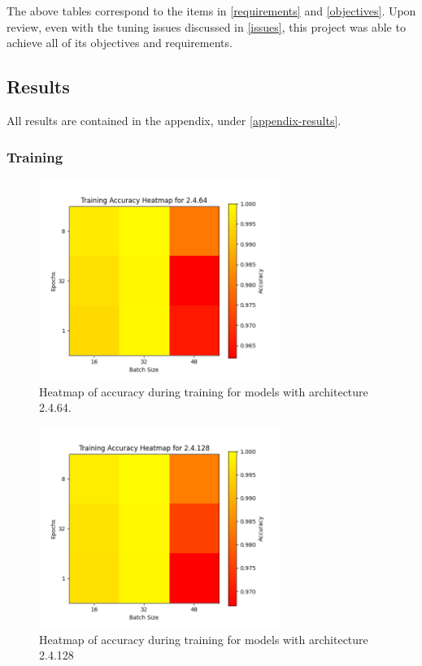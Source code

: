 \documentclass[12pt]{article}
\begin{document}
The above tables correspond to the items in \ref{requirements} and \ref{objectives}. Upon review, even with the tuning issues discussed in \ref{issues}, this project was able to achieve all of its objectives and requirements.

\subsection{Results}\label{results}

All results are contained in the appendix, under \ref{appendix-results}.

\subsubsection{Training}

\begin{figure}[H]
\includegraphics[width=0.7\textwidth]{heatmap_training_accuracy_2.4.64}
\centering
\caption{Heatmap of accuracy during training for models with architecture 2.4.64.}
\label{fig:time-metrics}
\end{figure}


\begin{figure}[H]
\includegraphics[width=0.7\textwidth]{heatmap_training_accuracy_2.4.128}
\centering
\caption{Heatmap of accuracy during training for models with architecture 2.4.128}
\label{fig:time-metrics}
\end{figure}
\end{document}
